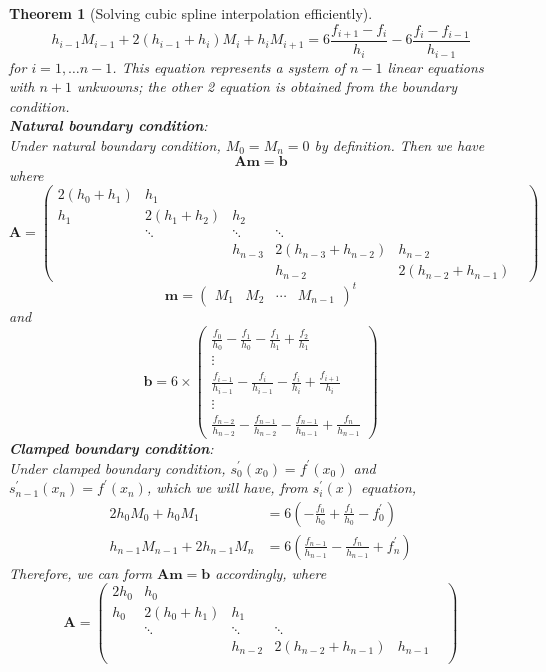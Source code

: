 \documentclass[12pt]{article}
\newtheorem{theorem}{Theorem}[section]
\theoremstyle{definition}
\begin{document}
\begin{theorem}[Solving cubic spline interpolation efficiently]
\[
h_{i-1}M_{i-1}+2(h_{i-1}+h_i)M_i+h_iM_{i+1} = 6\frac{f_{i+1}-f_i}{h_i}-6\frac{f_i-f_{i-1}}{h_{i-1}}
\]
for $i = 1,\ldots n-1$. This equation represents a system of $n-1$ linear equations with $n+1$ unkwowns; the other 2 equation is obtained from the boundary condition.\\
\textbf{Natural boundary condition}:\\
Under natural boundary condition, $M_0 = M_n = 0 $ by definition. Then we have 
\[
\mathbf{Am} = \mathbf{b}
\] 
where 
\[
\mathbf{A} = \begin{pmatrix} 2(h_0+h_1)&h_1&&&&\\
h_1&2(h_1+h_2)&h_2&&&\\
&\ddots&\ddots&\ddots&&\\
&&h_{n-3}&2(h_{n-3}+h_{n-2})&h_{n-2}&\\
&&&h_{n-2}&2(h_{n-2}+h_{n-1})\end{pmatrix}
\]
\[
\mathbf{m} = \begin{pmatrix} M_1&M_2&\cdots&M_{n-1}\end{pmatrix}^t
\]
and
\[
\mathbf{b} = 6\times\begin{pmatrix}
\frac{f_0}{h_0}-\frac{f_1}{h_0}-\frac{f_1}{h_1}+\frac{f_2}{h_1}\\
\vdots\\
\frac{f_{i-1}}{h_{i-1}}-\frac{f_i}{h_{i-1}}-\frac{f_i}{h_i}+\frac{f_{i+1}}{h_i}\\
\vdots\\
\frac{f_{n-2}}{h_{n-2}}-\frac{f_{n-1}}{h_{n-2}}-\frac{f_{n-1}}{h_{n-1}}+\frac{f_n}{h_{n-1}}\end{pmatrix}
\]
\textbf{Clamped boundary condition}:\\
Under clamped boundary condition, $s_0^\prime(x_0) = f^\prime(x_0)$ and $s_{n-1}^\prime(x_n) = f^\prime(x_n)$, which we will have, from $s_i^\prime (x)$ equation,
\begin{align*}
2h_0M_0+h_0M_1 &= 6(-\frac{f_0}{h_0}+\frac{f_1}{h_0}-f^\prime_0)\\
h_{n-1}M_{n-1}+2h_{n-1}M_n &= 6(\frac{f_{n-1}}{h_{n-1}}-\frac{f_n}{h_{n-1}}+f^\prime_n)
\end{align*}
Therefore, we can form $\mathbf{Am}=\mathbf{b}$ accordingly, where
\[
\mathbf{A} = \begin{pmatrix} 2h_0&h_0&&&&\\
h_0&2(h_0+h_1)&h_1&&&\\
&\ddots&\ddots&\ddots&&\\
&&h_{n-2}&2(h_{n-2}+h_{n-1})&h_{n-1}&\\

\end{pmatrix}\]
\end{theorem}
\end{document}
